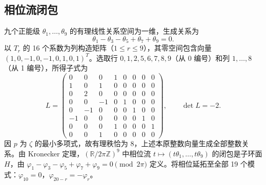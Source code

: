 \documentclass[11pt,a4paper]{article}
\newcommand{\R}{\mathbb R}\newcommand{\Q}{\mathbb Q}\newcommand{\Z}{\mathbb Z}\newcommand{\T}{\mathbb T}
\begin{document}
\subsection{相位流闭包}
九个正能级 $\theta_1,\ldots,\theta_9$ 的有理线性关系空间为一维，生成关系为
\begin{equation}\label{eq:rel}
\theta_1-\theta_3-\theta_5+\theta_7+\theta_9=0.
\end{equation}
以 $T_r$ 的 16 个系数为列构造矩阵（$1\le r\le9$），其零空间包含向量 $(1,0,-1,0,-1,0,1,0,1)^T$。选取行 $0,1,2,5,6,7,8,9$（从 0 编号）和列 $1,\ldots,8$（从 1 编号），所得子式为
\[
L=\begin{pmatrix}
0&0&0&1&0&0&0&0\\1&0&1&0&0&0&0&0\\0&2&0&0&0&0&0&0\\0&0&-1&0&1&0&0&0\\0&-1&0&0&0&1&0&0\\-1&0&0&0&0&0&1&0\\0&0&0&1&0&0&0&1\\0&0&1&0&0&0&0&0
\end{pmatrix},\qquad \det L=-2.
\]
因 $p$ 为 $\zeta$ 的最小多项式，故有理秩恰为 8，上述本原整数向量生成全部整数关系。由 Kronecker 定理，$(\R/2\pi\Z)^9$ 中相位流 $t\mapsto(t\theta_1,\ldots,t\theta_9)$ 的闭包是子环面 $H$，由 $\varphi_1-\varphi_3-\varphi_5+\varphi_7+\varphi_9=0\pmod{2\pi}$ 定义。将相位延拓至全部 19 个模式：$\varphi_{10}=0$，$\varphi_{20-r}=-\varphi_r$。
\end{document}
